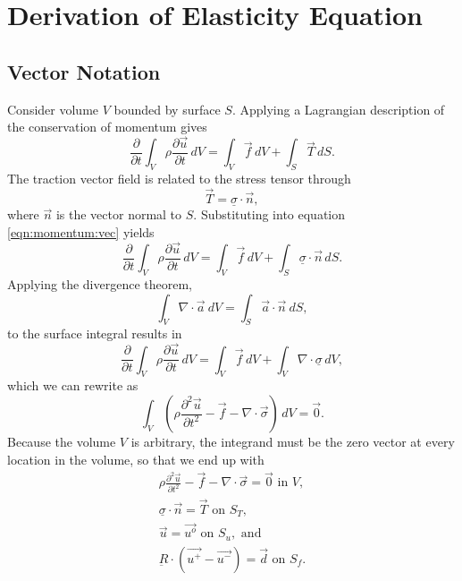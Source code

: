 \section{Derivation of Elasticity Equation}

\subsection{Vector Notation}

Consider volume $V$ bounded by surface $S$. Applying a Lagrangian
description of the conservation of momentum gives
\begin{equation}
\label{eqn:momentum:vec}
\frac{\partial}{\partial t}\int_{V}\rho\frac{\partial\vec{u}}{\partial t}\, dV=\int_{V}\overrightarrow{f}\, dV+\int_{S}\overrightarrow{T}\, dS.
\end{equation}
The traction vector field is related to the stress tensor through
\begin{equation}
\overrightarrow{T}=\underline{\sigma}\cdot\overrightarrow{n},
\end{equation}
where $\overrightarrow{n}$ is the vector normal to $S$. Substituting
into equation \vref{eqn:momentum:vec} yields
\begin{equation}
\frac{\partial}{\partial t}\int_{V}\rho\frac{\partial\overrightarrow{u}}{\partial t}\, dV=\int_{V}\overrightarrow{f}\, dV+\int_{S}\underline{\sigma}\cdot\overrightarrow{n}\, dS.
\end{equation}
Applying the divergence theorem,
\begin{equation}
\int_{V}\nabla\cdot\overrightarrow{a}\: dV=\int_{S}\overrightarrow{a}\cdot\overrightarrow{n}\: dS,
\end{equation}
to the surface integral results in
\begin{equation}
\frac{\partial}{\partial t}\int_{V}\rho\frac{\partial\overrightarrow{u}}{\partial t}\, dV=\int_{V}\overrightarrow{f}\, dV+\int_{V}\nabla\cdot\underline{\sigma}\, dV,
\end{equation}
which we can rewrite as
\begin{equation}
\int_{V}\left(\rho\frac{\partial^{2}\overrightarrow{u}}{\partial t^{2}}-\overrightarrow{f}-\nabla\cdot\overrightarrow{\sigma}\right)\, dV=\vec{0}.
\end{equation}
Because the volume $V$ is arbitrary, the integrand must be the zero
vector at every location in the volume, so that we end up with
\begin{gather}
\rho\frac{\partial^{2}\overrightarrow{u}}{\partial t^{2}}-\overrightarrow{f}-\nabla\cdot\overrightarrow{\sigma}=\vec{0}\text{ in }V,\\
\underline{\sigma}\cdot\overrightarrow{n}=\overrightarrow{T}\text{ on }S_{T}\text{,}\\
\overrightarrow{u}=\overrightarrow{u^{o}}\text{ on }S_{u},\text{ and}\\
\underbar{R}\cdot(\vec{u^{+}}-\vec{u^{-}})=\vec{d}\text{ on }S_{f}.
\end{gather}
